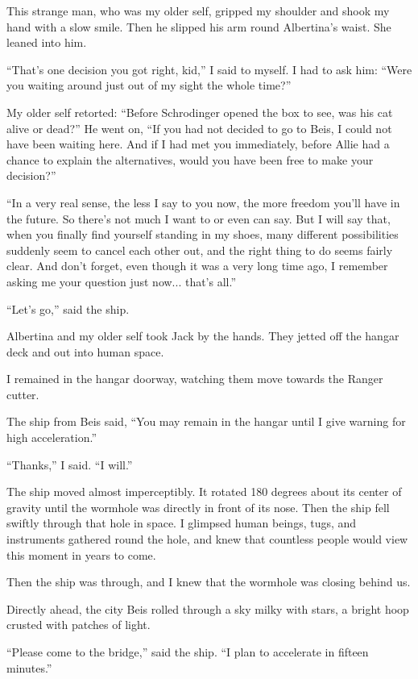 \documentclass[english,11pt,letterpaper,onecolumn]{scrbook}
\begin{document}
	This strange man, who was my older self, gripped my shoulder and shook my hand with a slow smile.  Then he slipped his arm round Albertina's waist.  She leaned into him.

	``That's one decision you got right, kid,'' I said to myself.  I had to ask him:  ``Were you waiting around just out of my sight the whole time?''

	My older self retorted:  ``Before Schrodinger opened the box to see, was his cat alive or dead?''  He went on, ``If you had not decided to go to Beis, I could not have been waiting here.  And if I had met you immediately, before Allie had a chance to explain the alternatives, would you have been free to make your decision?''

	``In a very real sense, the less I say to you now, the more freedom you'll have in the future.  So there's not much I want to or even can say.  But I will say that, when you finally find yourself standing in my shoes, many different possibilities suddenly seem to cancel each other out, and the right thing to do seems fairly clear.  And don't forget, even though it was a very long time ago, I remember asking me your question just now... that's all.''	

	``Let's go,'' said the ship.

	Albertina and my older self took Jack by the hands.  They jetted off the hangar deck and out into human space.

	I remained in the hangar doorway, watching them move towards the Ranger cutter.

	The ship from Beis said, ``You may remain in the hangar until I give warning for high acceleration.''

	``Thanks,'' I said.  ``I will.''

	The ship moved almost imperceptibly.  It rotated 180 degrees about its center of gravity until the wormhole was directly in front of its nose.  Then the ship fell swiftly through that hole in space.  I glimpsed human beings, tugs, and instruments gathered round the hole, and knew that countless people would view this moment in years to come.

	Then the ship was through, and I knew that the wormhole was closing behind us.

	Directly ahead, the city Beis rolled through a sky milky with stars, a bright hoop crusted with patches of light.

	``Please come to the bridge,'' said the ship.  ``I plan to accelerate in fifteen minutes.''
\end{document}
